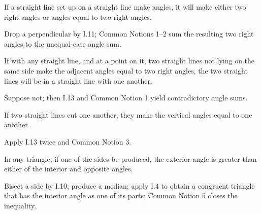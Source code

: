\documentclass{rrxiv}
\begin{document}
\begin{claim}
\label{prop:I.13}
If a straight line set up on a straight line make angles, it will
make either two right angles or angles equal to two right angles.
\end{claim}
\begin{evidence}[Proof of I.13]
\label{ev:I.13}
Drop a perpendicular by I.11; Common Notions 1--2 sum the resulting
two right angles to the unequal-case angle sum.
\end{evidence}

\begin{claim}
\label{prop:I.14}
If with any straight line, and at a point on it, two straight lines
not lying on the same side make the adjacent angles equal to two
right angles, the two straight lines will be in a straight line with
one another.
\end{claim}
\begin{evidence}[Proof of I.14]
\label{ev:I.14}
Suppose not; then I.13 and Common Notion 1 yield contradictory angle
sums.
\end{evidence}

\begin{claim}
\label{prop:I.15}
If two straight lines cut one another, they make the vertical angles
equal to one another.
\end{claim}
\begin{evidence}[Proof of I.15]
\label{ev:I.15}
Apply I.13 twice and Common Notion 3.
\end{evidence}

\begin{claim}
\label{prop:I.16}
In any triangle, if one of the sides be produced, the exterior angle
is greater than either of the interior and opposite angles.
\end{claim}
\begin{evidence}[Proof of I.16]
\label{ev:I.16}
Bisect a side by I.10; produce a median; apply I.4 to obtain a
congruent triangle that has the interior angle as one of its parts;
Common Notion 5 closes the inequality.
\end{evidence}
\end{document}
